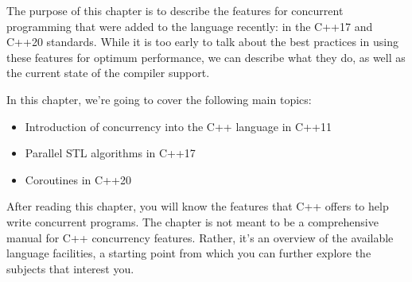 The purpose of this chapter is to describe the features for concurrent programming that were added to the language recently: in the C++17 and C++20 standards. While it is too early to talk about the best practices in using these features for optimum performance, we can describe what they do, as well as the current state of the compiler support.

In this chapter, we're going to cover the following main topics:

\begin{itemize}
\item
Introduction of concurrency into the C++ language in C++11

\item
Parallel STL algorithms in C++17

\item
Coroutines in C++20
\end{itemize}

After reading this chapter, you will know the features that C++ offers to help write concurrent programs. The chapter is not meant to be a comprehensive manual for C++ concurrency features. Rather, it's an overview of the available language facilities, a starting point from which you can further explore the subjects that interest you.